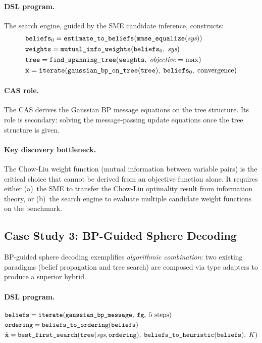 \documentclass[12pt,a4paper]{article}
\newcommand{\bx}{\mathbf{x}}
\begin{document}
\paragraph{DSL program.}
The search engine, guided by the SME candidate inference, constructs:
\begin{align}
  &\texttt{beliefs}_0 = \texttt{estimate\_to\_beliefs}(\texttt{mmse\_equalize}(\textit{sys})) \notag\\
  &\texttt{weights} = \texttt{mutual\_info\_weights}(\texttt{beliefs}_0,\; \textit{sys}) \notag\\
  &\texttt{tree} = \texttt{find\_spanning\_tree}(\texttt{weights},\; \textit{objective}=\max) \notag\\
  &\hat{\bx} = \texttt{iterate}(\texttt{gaussian\_bp\_on\_tree}(\texttt{tree}),\;\texttt{beliefs}_0,\;\text{convergence}) \notag
\end{align}

\paragraph{CAS role.}
The CAS derives the Gaussian BP message equations on the tree structure.  Its
role is secondary: solving the message-passing update equations once the tree
structure is given.

\paragraph{Key discovery bottleneck.}
The Chow-Liu weight function (mutual information between variable pairs) is the
critical choice that cannot be derived from an objective function alone.  It
requires either (a)~the SME to transfer the Chow-Liu optimality result from
information theory, or (b)~the search engine to evaluate multiple candidate
weight functions on the benchmark.

\subsection{Case Study 3: BP-Guided Sphere Decoding}
\label{sec:bpsd}

BP-guided sphere decoding exemplifies \emph{algorithmic combination}: two
existing paradigms (belief propagation and tree search) are composed via
type adapters to produce a superior hybrid.

\paragraph{DSL program.}
\begin{align}
  &\texttt{beliefs} = \texttt{iterate}(\texttt{gaussian\_bp\_message},\; \texttt{fg},\; 5\text{ steps}) \notag\\
  &\texttt{ordering} = \texttt{beliefs\_to\_ordering}(\texttt{beliefs}) \notag\\
  &\hat{\bx} = \texttt{best\_first\_search}(\texttt{tree}(\textit{sys},\texttt{ordering}),\;
                \texttt{beliefs\_to\_heuristic}(\texttt{beliefs}),\; K) \notag
\end{align}
\end{document}
